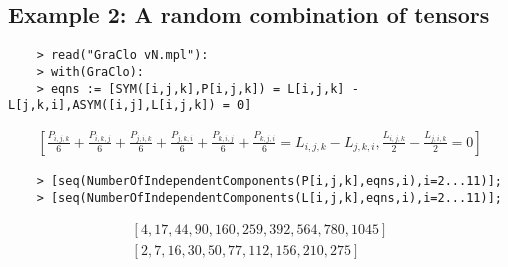 \documentclass{article}
\begin{document}
\subsection*{Example 2: A random combination of tensors}
\begin{verbatim}
    > read("GraClo vN.mpl"):
    > with(GraClo):
    > eqns := [SYM([i,j,k],P[i,j,k]) = L[i,j,k] - L[j,k,i],ASYM([i,j],L[i,j,k]) = 0]
\end{verbatim}
\begin{equation*}
    \begin{split}
        [{\frac {P_{{i,j,k}}}{6}}+{\frac {P_{{i,k,j}}}{6}}+{\frac {P_{{j,i,k}}
}{6}}+{\frac {P_{{j,k,i}}}{6}}+{\frac {P_{{k,i,j}}}{6}}+{\frac {P_{{k,
j,i}}}{6}}=L_{{i,j,k}}-L_{{j,k,i}},{\frac {L_{{i,j,k}}}{2}}-{\frac {L_
{{j,i,k}}}{2}}=0]
    \end{split}
\end{equation*}
\begin{verbatim}
    > [seq(NumberOfIndependentComponents(P[i,j,k],eqns,i),i=2...11)];
    > [seq(NumberOfIndependentComponents(L[i,j,k],eqns,i),i=2...11)];
\end{verbatim}
\begin{equation*}
    \begin{split}
        [4,17,44,90,160,259,392,564,780,1045]\\
[2,7,16,30,50,77,112,156,210,275]
    \end{split}
\end{equation*}



\end{document}
